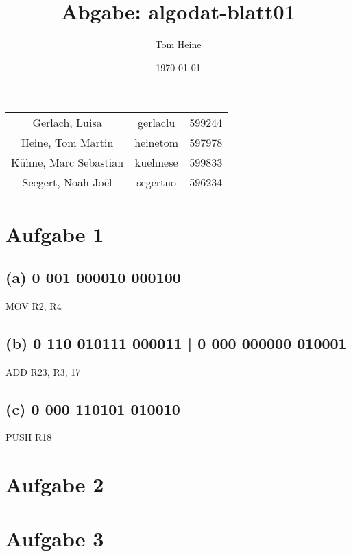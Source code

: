 \documentclass[12pt,a4paper]{scrartcl}
\author{Tom Heine}
\title{Abgabe: algodat-blatt01}
\date{\today}
\begin{document}
	\newpage
	\begin{center}
		\begin{tabular}{ccc}
			Gerlach, Luisa&gerlaclu&599244\\
			Heine, Tom Martin&heinetom&597978\\
			Kühne, Marc Sebastian&kuehnese&599833\\
			Seegert, Noah-Joël&segertno&596234
		\end{tabular}
	\end{center}
	\section*{Aufgabe 1}
	\subsection*{(a) 0 001 000010 000100}
		MOV R2, R4
	\subsection*{(b) 0 110 010111 000011 |
					 0 000 000000 010001}
		ADD R23, R3, 17
	\subsection*{(c) 0 000 110101 010010}
		PUSH R18
	\newpage
	\section*{Aufgabe 2}
	\newpage
		
	\section*{Aufgabe 3}
	
	\begin{comment}
		\begin{center}
		\begin{tabular}{|c |c | c|} 
			\hline
			Adresse & Mikrobefehl & Kommentar\\
			\hline\hline
			0 & RD & ließt Befehl ein\\ 
			\hline
			1 & WRDY& wartet, bis Speicherzugriff beendet wurde \\
			\hline
			2 & DECODE & dekodiert IR\\
			\hline
			3 & IR\_op\_out& ließt IR\\
			\hline
			4 & SR = Rop2 & wählt Register 2\\
			\hline
			5 & R\_out & schreibt in Register 2\\
			\hline
			6 & WRDY& wartet, bis Speicherzugriff beendet wurde \\
			\hline
		\end{tabular}
	\end{center}
	\end{comment}
	
\end{document}
